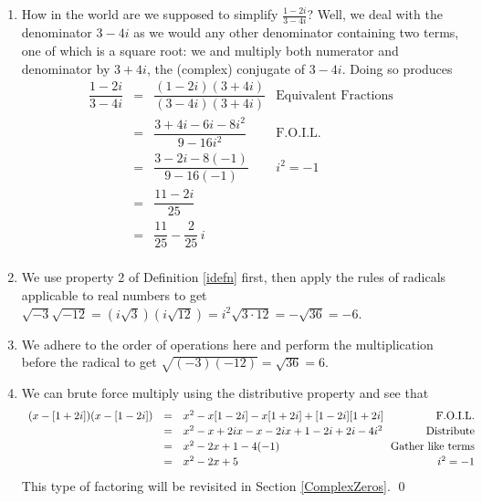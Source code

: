 \documentclass[10pt]{article}
\begin{document}
\begin{ex}
\begin{enumerate}
\item  How in the world are we supposed to simplify $\frac{1-2i}{3-4i}$?  Well, we deal with the denominator $3-4i$ as we would any other denominator containing two terms, one of which is a square root: we and multiply both numerator and denominator by $3+4i$, the (complex) conjugate of $3 - 4i$.  Doing so produces\[\begin{array}{rclr}

 \dfrac{1-2i}{3-4i} & = & \dfrac{(1-2i)(3+4i)}{(3-4i)(3+4i)} & \text{Equivalent Fractions} \\[8pt]

                     & = &   \dfrac{3 + 4i - 6i - 8i^2}{9 - 16i^2} & \text{F.O.I.L.}\\[8pt]
										 & = & \dfrac{3 - 2i - 8(-1)}{9  - 16(-1)} & \text{$i^2 = -1$}\\[8pt]
						         & = &  \dfrac{11 - 2i}{25} & \\[8pt]
										  & = & \dfrac{11}{25} - \dfrac{2}{25} \, i & \\ \end{array}\]
										

\item  We use property 2 of Definition \ref{idefn} first, then apply the rules of radicals applicable to real numbers to get $\sqrt{-3} \sqrt{-12} = \left(i \sqrt{3}\right) \left(i \sqrt{12}\right) = i^2 \sqrt{3\cdot 12} = -\sqrt{36} = -6$.

\item  We adhere to the order of operations here and perform the multiplication before the radical to get  $\sqrt{(-3)(-12)} = \sqrt{36} = 6$. 

\item  We can brute force multiply using the distributive property and see that \[\begin{array}{rclr} (x-[1+2i])(x-[1-2i]) & = &  x^2 -x[1-2i]-x[1+2i]+[1-2i][1+2i] & \text{F.O.I.L.}\\[2pt]

																					 &	= & x^2-x+2ix-x-2ix+1-2i+2i-4i^2 & \text{Distribute} \\ [2pt]
																					 &	= & x^2-2x + 1-4(-1)& \hspace*{-.05in}\text{Gather like terms}\\[2pt]
																					 & =  & x^2 -2x +5 & i^2=-1 \\ \end{array}\] This type of factoring will be revisited in Section \ref{ComplexZeros}. \qed

\end{enumerate}

\end{ex}
\end{document}

